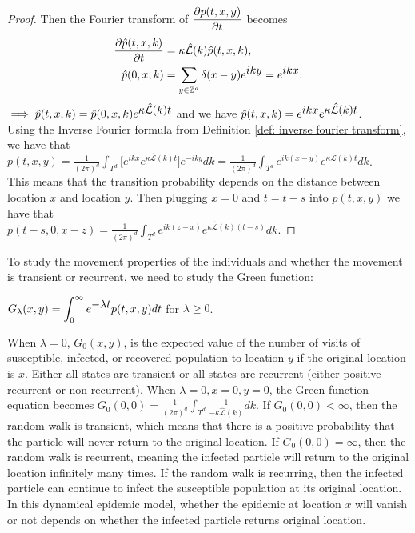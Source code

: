 \documentclass[sn-basic]{sn-jnl}%
\theoremstyle{thmstyleone}%
\theoremstyle{thmstyletwo}%
\theoremstyle{thmstylethree}%
\numberwithin{equation}{theorem}
\begin{document}
\begin{proof}
Then the Fourier transform of $\displaystyle \frac{\partial \mathnormal{p}(t,x,y)}{\partial t}$ becomes
\begin{align}
\displaystyle \frac{\partial \hat{\mathnormal{p}}(t,x,k)}{\partial t} &= \kappa \hat{\mathcal{L}}(k) \hat{\mathnormal{p}}(t,x,k),\\
\hat{\mathnormal{p}}(0,x,k) &= \sum\limits_{y \in \mathbb{Z}^{d}} \delta(x-y) e^{\displaystyle iky} = e^{\displaystyle ikx}.
\end{align}
$\implies \hat{\mathnormal{p}}(t,x,k)= \hat{\mathnormal{p}}(0,x,k) e^{\displaystyle \kappa \hat{\mathcal{L}}(k) t}$ and we have $\hat{\mathnormal{p}}(t,x,k)= e^{\displaystyle ikx} e^{\displaystyle \kappa \hat{\mathcal{L}}(k) t}$.\\
Using the Inverse Fourier formula from Definition \ref{def: inverse fourier transform}, we have that\\
$p(t,x,y) = \displaystyle \frac{1}{(2 \pi)^{d}} \displaystyle \int_{T^{d}} \big[ e^{\displaystyle ikx} e^{\displaystyle \kappa \hat{\mathcal{L}}(k) t} \big] e^{\displaystyle -iky}dk = \displaystyle \frac{1}{(2 \pi)^d} \int_{T^{d}} e^{\displaystyle ik(x-y)} e^{\displaystyle \kappa \hat{\mathcal{L}}(k) t} dk$.\\

This means that the transition probability depends on the distance between location $x$ and location $y$. Then plugging $x=0$ and $t=t-s$ into ${p}(t,x,y)$ we have that\\

$p(t-s,0,x-z) = \displaystyle \frac{1}{(2 \pi)^{d}} \int_{T^{d}} e^{\displaystyle ik(z-x)} e^{\displaystyle \kappa \hat{\mathcal{L}}(k)(t-s)}dk$.
\end{proof}

To study the movement properties of the individuals and whether the movement is transient or recurrent, we need to study the Green function:
\begin{center}
$G_{\lambda}(x,y) = \displaystyle \int_{0}^{\infty} e^{\displaystyle -\lambda t} \mathnormal{p}(t,x,y)dt$ for $\lambda \ge 0$.
\end{center}
When $\lambda=0$, $G_{0}(x,y)$, is the expected value of the number of visits of susceptible, infected, or recovered population to location $y$ if the original location is $x$. Either all states are transient or all states are recurrent (either positive recurrent or non-recurrent). When $\lambda =0, x=0, y=0$, the Green function equation becomes $G_{0}(0,0) = \displaystyle \frac{1}{(2 \pi)^{d}} \int_{T^{d}} \displaystyle \frac{1}{- \kappa \hat{\mathcal{L}}(k)} dk$. If $G_{0}(0,0) < \infty$, then the random walk is transient, which means that there is a positive probability that the particle will never return to the original location. If $G_{0}(0,0) = \infty$, then the random walk is recurrent, meaning the infected particle will return to the original location infinitely many times. If the random walk is recurring, then the infected particle can continue to infect the susceptible population at its original location. In this dynamical epidemic model, whether the epidemic at location $x$ will vanish or not depends on whether the infected particle returns original location.
\end{document}
